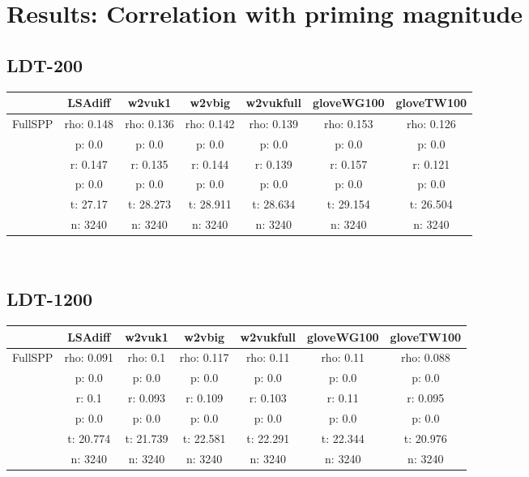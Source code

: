 \documentclass{article}
\begin{document}
\section{Results: Correlation with priming magnitude}\label{pri}
\subsection{LDT-200} 
\begin{tabular}{ccccccc|}\cline{2-7}
&\multicolumn{1}{|c}{LSAdiff} & w2vuk1 & w2vbig & w2vukfull & gloveWG100 & gloveTW100 \\\hline
\multicolumn{1}{|c|}{\multirow{6}{*}{FullSPP}} & rho: 0.148 & rho: 0.136 & rho: 0.142 & rho: 0.139 & rho: 0.153 & rho: 0.126 \\
\multicolumn{1}{|c|}{} & p: 0.0 & p: 0.0 & p: 0.0 & p: 0.0 & p: 0.0 & p: 0.0 \\
\multicolumn{1}{|c|}{} & r: 0.147 & r: 0.135 & r: 0.144 & r: 0.139 & r: 0.157 & r: 0.121 \\
\multicolumn{1}{|c|}{} & p: 0.0 & p: 0.0 & p: 0.0 & p: 0.0 & p: 0.0 & p: 0.0 \\
\multicolumn{1}{|c|}{} & t: 27.17 & t: 28.273 & t: 28.911 & t: 28.634 & t: 29.154 & t: 26.504 \\
\multicolumn{1}{|c|}{} & n: 3240 & n: 3240 & n: 3240 & n: 3240 & n: 3240 & n: 3240 \\
\hline
\end{tabular}\\
\subsection{LDT-1200}
\begin{tabular}{ccccccc|}\cline{2-7}
&\multicolumn{1}{|c}{LSAdiff} & w2vuk1 & w2vbig & w2vukfull & gloveWG100 & gloveTW100 \\\hline
\multicolumn{1}{|c|}{\multirow{6}{*}{FullSPP}} & rho: 0.091 & rho: 0.1 & rho: 0.117 & rho: 0.11 & rho: 0.11 & rho: 0.088 \\
\multicolumn{1}{|c|}{} & p: 0.0 & p: 0.0 & p: 0.0 & p: 0.0 & p: 0.0 & p: 0.0 \\
\multicolumn{1}{|c|}{} & r: 0.1 & r: 0.093 & r: 0.109 & r: 0.103 & r: 0.11 & r: 0.095 \\
\multicolumn{1}{|c|}{} & p: 0.0 & p: 0.0 & p: 0.0 & p: 0.0 & p: 0.0 & p: 0.0 \\
\multicolumn{1}{|c|}{} & t: 20.774 & t: 21.739 & t: 22.581 & t: 22.291 & t: 22.344 & t: 20.976 \\
\multicolumn{1}{|c|}{} & n: 3240 & n: 3240 & n: 3240 & n: 3240 & n: 3240 & n: 3240 \\
\hline
\end{tabular}\\
\end{document}
